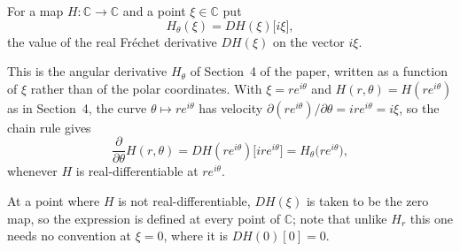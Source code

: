 \begin{definition}
For a map $H\colon\mathbb{C}\to\mathbb{C}$ and a point $\xi\in\mathbb{C}$ put
\[
  H_\theta(\xi)=DH(\xi)\bigl[i\xi\bigr],
\]
the value of the real Fr\'echet derivative $DH(\xi)$ on the vector $i\xi$.

This is the angular derivative $H_\theta$ of Section~4 of the paper, written as
a function of $\xi$ rather than of the polar coordinates.  With
$\xi=re^{i\theta}$ and $H(r,\theta)=H(re^{i\theta})$ as in Section~4, the curve
$\theta\mapsto re^{i\theta}$ has velocity
$\partial(re^{i\theta})/\partial\theta=ire^{i\theta}=i\xi$, so the chain rule
gives
\[
  \frac{\partial}{\partial\theta}H(r,\theta)=DH(re^{i\theta})\bigl[ire^{i\theta}\bigr]
  =H_\theta\bigl(re^{i\theta}\bigr),
\]
whenever $H$ is real-differentiable at $re^{i\theta}$.

At a point where $H$ is not real-differentiable,
$DH(\xi)$ is taken to be the zero map, so the expression is defined at every
point of $\mathbb{C}$; note that unlike $H_r$ this one needs no convention at
$\xi=0$, where it is $DH(0)[0]=0$.
\end{definition}
